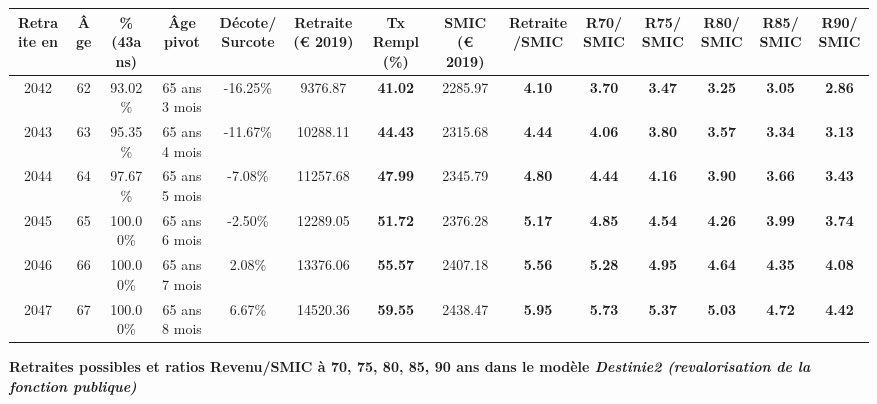\begin{adjustbox}{max width=\textwidth} 
\begin{tabular}[htb]{|c|c||c|c|c||c|c||c|c||c|c|c|c|c|} 
\hline 
 Retraite en &  Âge &  \%(43ans) &  Âge pivot &  Décote/Surcote &  Retraite (\euro{} 2019) &  Tx Rempl(\%) &  SMIC (\euro{} 2019) &  Retraite/SMIC &  R70/SMIC &  R75/SMIC &  R80/SMIC &  R85/SMIC &  R90/SMIC \\ 
\hline \hline 
 2042 &  62 &  93.02\% &  65 ans 3 mois &  -16.25\% &  9376.87 &  {\bf 41.02} &  2285.97 &  {\bf 4.10} &  {\bf 3.70} &  {\bf 3.47} &  {\bf 3.25} &  {\bf 3.05} &  {\bf 2.86} \\ 
\hline 
 2043 &  63 &  95.35\% &  65 ans 4 mois &  -11.67\% &  10288.11 &  {\bf 44.43} &  2315.68 &  {\bf 4.44} &  {\bf 4.06} &  {\bf 3.80} &  {\bf 3.57} &  {\bf 3.34} &  {\bf 3.13} \\ 
\hline 
 2044 &  64 &  97.67\% &  65 ans 5 mois &  -7.08\% &  11257.68 &  {\bf 47.99} &  2345.79 &  {\bf 4.80} &  {\bf 4.44} &  {\bf 4.16} &  {\bf 3.90} &  {\bf 3.66} &  {\bf 3.43} \\ 
\hline 
 2045 &  65 &  100.00\% &  65 ans 6 mois &  -2.50\% &  12289.05 &  {\bf 51.72} &  2376.28 &  {\bf 5.17} &  {\bf 4.85} &  {\bf 4.54} &  {\bf 4.26} &  {\bf 3.99} &  {\bf 3.74} \\ 
\hline 
 2046 &  66 &  100.00\% &  65 ans 7 mois &  2.08\% &  13376.06 &  {\bf 55.57} &  2407.18 &  {\bf 5.56} &  {\bf 5.28} &  {\bf 4.95} &  {\bf 4.64} &  {\bf 4.35} &  {\bf 4.08} \\ 
\hline 
 2047 &  67 &  100.00\% &  65 ans 8 mois &  6.67\% &  14520.36 &  {\bf 59.55} &  2438.47 &  {\bf 5.95} &  {\bf 5.73} &  {\bf 5.37} &  {\bf 5.03} &  {\bf 4.72} &  {\bf 4.42} \\ 
\hline 
\hline 
\end{tabular} 
\end{adjustbox} 
 
 \vspace{0.1cm} 
{\bf \noindent Retraites possibles et ratios Revenu/SMIC à 70, 75, 80, 85, 90 ans dans le modèle \emph{Destinie2 (revalorisation de la fonction publique)}}  
 

